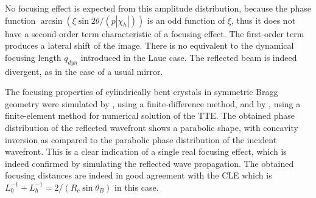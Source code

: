 \documentclass[preprint]{iucr}              %
\newcommand{\inred}[1]{{\color{red}#1}}
\begin{document}
No focusing effect is expected from this amplitude distribution, because the phase function $\arcsin(\xi \sin2\theta/ (p |\chi_h|))$ \inred{is} an odd function of $\xi$, \inred{thus it does not have a} second-order term characteristic of a focusing effect. The first-order term produces a lateral shift of the image. There is no equivalent to the dynamical focusing length $q_{dyn}$ introduced in the Laue case. The reflected beam is indeed divergent, as in the case of a usual mirror.

The focusing properties of cylindrically bent crystals in symmetric Bragg geometry were simulated by \cite{sutter2010}, using a finite-difference method, and by \cite{honkanen2017, Honkanen2018}, using a finite-element method for numerical solution of the TTE. The obtained phase distribution of the reflected wavefront shows a parabolic shape, with concavity inversion as compared to the parabolic phase distribution of the incident wavefront. This is a clear indication of a single real focusing effect, which is indeed confirmed by simulating the reflected wave propagation. The obtained focusing distances are indeed in good agreement with the CLE which is $L_0^{-1}+L_h^{-1}=2/(R_c \sin\theta_B)$ in this case.









\end{document}
